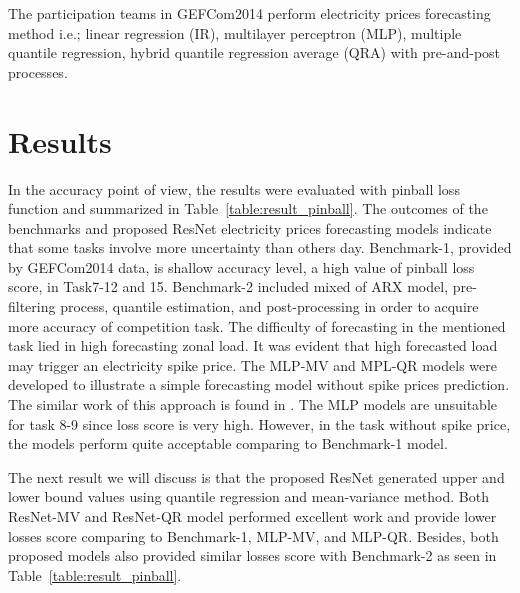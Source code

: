 \documentclass[review]{elsarticle}
\begin{document}
      The participation teams in GEFCom2014 perform electricity prices forecasting method i.e.; linear regression (IR)\cite{Dudek2016}, multilayer perceptron (MLP)\cite{Dudek2016},  multiple quantile regression\cite{Juban2016}, hybrid quantile regression average (QRA) with pre-and-post processes\cite{Maciejowska2016}.

  \section{Results}
    In the accuracy point of view, the results were evaluated with pinball loss function and summarized in Table~\ref{table:result_pinball}.
    The outcomes of the benchmarks and proposed ResNet electricity prices forecasting models indicate that some tasks involve more uncertainty than others day.
    Benchmark-1, provided by GEFCom2014 data, is shallow accuracy level, a high value of pinball loss score, in Task7-12 and 15.
    Benchmark-2 included mixed of ARX model, pre-filtering process, quantile estimation, and post-processing in order to acquire more accuracy of competition task.
    The difficulty of forecasting in the mentioned task lied in high forecasting zonal load.
    It was evident that high forecasted load may trigger an electricity spike price.
    The MLP-MV and MPL-QR models were developed to illustrate a simple forecasting model without spike prices prediction.
    The similar work of this approach is found in \cite{Dudek2016}.
    The MLP models are unsuitable for task 8-9 since loss score is very high.
    However, in the task without spike price, the models perform quite acceptable comparing to Benchmark-1 model.

    The next result we will discuss is that the proposed ResNet generated upper and lower bound values using quantile regression and mean-variance method.
    Both ResNet-MV and ResNet-QR model performed excellent work and provide lower losses score comparing to Benchmark-1, MLP-MV, and MLP-QR.
    Besides, both proposed models also provided similar losses score with Benchmark-2 as seen in Table~\ref{table:result_pinball}.
\end{document}
